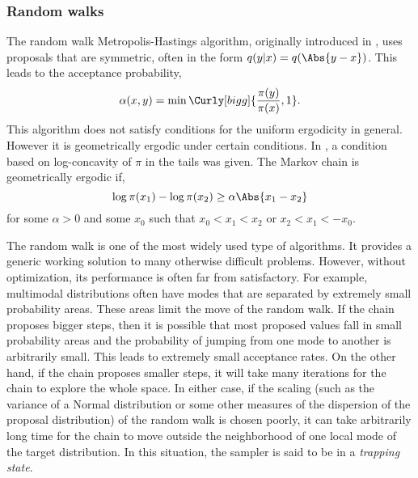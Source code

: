 \subsubsection{Random walks}
\label{ssub:Random walks}

The random walk Metropolis-Hastings algorithm, originally introduced in \cite{Metropolis:1953ex}, uses proposals that are symmetric, often in the form $q(y|x) = q(\Abs{y - x})$. This leads to the acceptance probability,
\begin{equation}
  \alpha(x,y) = \min\Curly[bigg]{\frac{\pi(y)}{\pi(x)},1}.
\end{equation}
This algorithm does not satisfy conditions for the uniform ergodicity in general. However it is geometrically ergodic under certain conditions. In \cite{Mengersen:1996th}, a condition based on log-concavity of $\pi$ in the tails was given. The Markov chain is geometrically ergodic if,
\begin{equation}
  \log\pi(x_1) - \log\pi(x_2) \ge \alpha\Abs{x_1 - x_2}
\end{equation}
for some $\alpha > 0$ and some $x_0$ such that $x_0 < x_1 < x_2$ or $x_2 < x_1 < -x_0$.

The random walk is one of the most widely used type of \mcmc algorithms. It provides a generic working solution to many otherwise difficult problems. However, without optimization, its performance is often far from satisfactory. For example, multimodal distributions often have modes that are separated by extremely small probability areas. These areas limit the move of the random walk. If the chain proposes bigger steps, then it is possible that most proposed values fall in small probability areas and the probability of jumping from one mode to another is arbitrarily small. This leads to extremely small acceptance rates. On the other hand, if the chain proposes smaller steps, it will take many iterations for the chain to explore the whole space. In either case, if the scaling (such as the variance of a Normal distribution or some other measures of the dispersion of the proposal distribution) of the random walk is chosen poorly, it can take arbitrarily long time for the chain to move outside the neighborhood of one local mode of the target distribution. In this situation, the sampler is said to be in a \emph{trapping state}.

